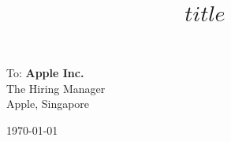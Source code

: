 \documentclass[11pt, a4paper]{article}
\title{$title$}
\begin{document}
\maketitle
\vspace{1em}

\begin{minipage}[t]{0.49\textwidth} 
  To: {\bf Apple Inc.} \\
  {
    The Hiring Manager\\
    Apple, Singapore
  }
\end{minipage}\hfill\begin{minipage}[t]{0.49\textwidth}
  \begin{flushright}\today\end{flushright}
\end{minipage}

\vspace{2em}
\end{document}
